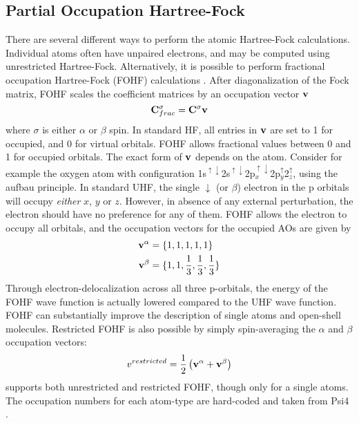 \subsection{Partial Occupation Hartree-Fock}

There are several different ways to perform the atomic Hartree-Fock calculations. Individual atoms often have  unpaired electrons, and may be computed using unrestricted Hartree-Fock. Alternatively, it is possible to perform fractional occupation Hartree-Fock (FOHF) calculations \cite{Bra1980}. After diagonalization of the Fock matrix, FOHF scales the coefficient matrices by an occupation vector $\mathbf{v}$
\begin{equation}
\mathbf{C}^{\sigma}_{frac} = \mathbf{C}^{\sigma} \mathbf{v}
\end{equation} 
\noindent where $\sigma$ is either $\alpha$ or $\beta$ spin. In standard HF, all entries in $\mathbf{v}$ are set to 1 for occupied, and 0 for virtual orbitals. FOHF allows fractional values between 0 and 1 for occupied orbitals. The exact form of $\mathbf{v}$ depends on the atom. Consider for example the oxygen atom with configuration 1s$^{\uparrow\downarrow}$2s$^{\uparrow\downarrow}$2p$_x^{\uparrow\downarrow}$2p$_y^{\uparrow}$2$_z^{\uparrow}$, using the aufbau principle. In standard UHF, the single $\downarrow$ (or $\beta$) electron in the p orbitals will occupy \emph{either} $x$, $y$ or $z$. However, in absence of any external perturbation, the electron should have no preference for any of them. FOHF allows the electron to occupy all orbitals, and the occupation vectors for the occupied AOs are given by
\begin{align}
\mathbf{v}^{\alpha} &= \{1,1,1,1,1\} \\
\mathbf{v}^{\beta} &= \{1,1,\frac{1}{3},\frac{1}{3},\frac{1}{3}\}
\end{align}
\noindent Through electron-delocalization across all three p-orbitals, the energy of the FOHF wave function is actually lowered compared to the UHF wave function. FOHF can substantially improve the description of single atoms and open-shell molecules. Restricted FOHF is also possible by simply spin-averaging the $\alpha$ and $\beta$ occupation vectors:
\begin{equation}
v^{restricted} = \frac{1}{2} \left( \mathbf{v}^{\alpha} + \mathbf{v}^{\beta} \right)
\end{equation}
\noindent \mchem{} supports both unrestricted and restricted FOHF, though only for a single atoms. The occupation numbers for each atom-type are hard-coded and taken from Psi4 \cite{Tur2012}.

